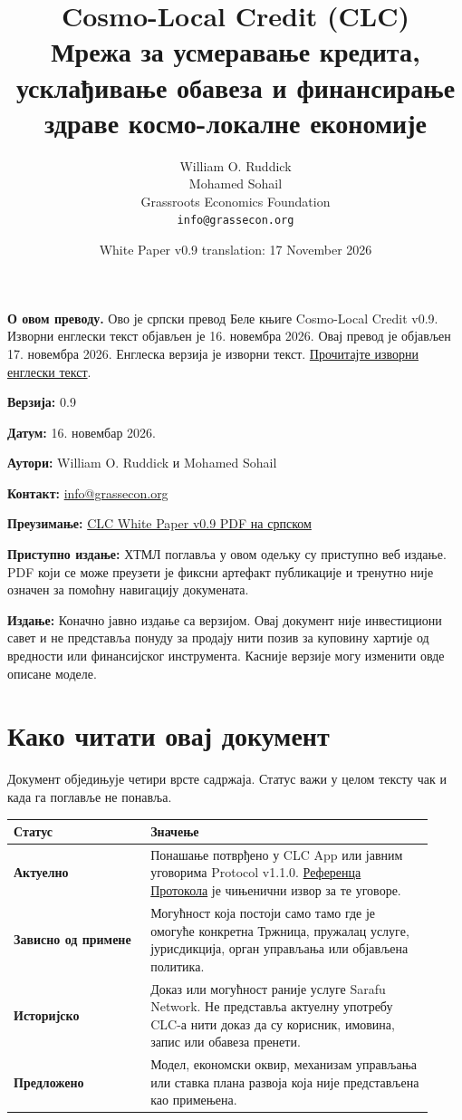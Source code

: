 \documentclass[11pt]{article}
\title{Cosmo-Local Credit (CLC)\\Мрежа за усмеравање кредита, усклађивање обавеза и финансирање здраве космо-локалне економије}
\author{William O. Ruddick \\ Mohamed Sohail \\ Grassroots Economics Foundation \\ \texttt{info@grassecon.org}}
\date{White Paper v0.9 translation: 17 November 2026}
\begin{document}
\maketitle
\tableofcontents
\newpage
\sloppy
\RaggedRight

\textbf{О овом преводу.} Ово је српски превод Беле књиге Cosmo-Local Credit v0.9. Изворни енглески текст објављен је 16. новембра 2026. Овај превод је објављен 17. новембра 2026. Енглеска верзија је изворни текст. \href{https://docs.cosmolocal.credit/white-paper}{Прочитајте изворни енглески текст}.

\textbf{Верзија:} 0.9

\textbf{Датум:} 16. новембар 2026.

\textbf{Аутори:} William O. Ruddick и Mohamed Sohail

\textbf{Контакт:} \href{mailto:info@grassecon.org}{info@grassecon.org}

\textbf{Преузимање:} \href{https://docs.cosmolocal.credit/white-paper/Cosmo-Local-Credit-CLC-White-Paper-v9-sr.pdf}{CLC White Paper v0.9 PDF на српском}

\textbf{Приступно издање:} ХТМЛ поглавља у овом одељку су приступно веб издање. PDF који се може преузети је фиксни артефакт публикације и тренутно није означен за помоћну навигацију докумената.

\textbf{Издање:} Коначно јавно издање са верзијом. Овај документ није инвестициони савет и не представља понуду за продају нити позив за куповину хартије од вредности или финансијског инструмента. Касније верзије могу изменити овде описане моделе.

\section*{Како читати овај документ}

Документ обједињује четири врсте садржаја. Статус важи у целом тексту чак и када га поглавље не понавља.

\begin{longtable}{P{0.30\linewidth} P{0.62\linewidth}}
\toprule
Статус & Значење \\
\midrule
\endhead
\textbf{Актуелно} & Понашање потврђено у CLC App или јавним уговорима Protocol v1.1.0. \href{https://docs.cosmolocal.credit/sr/protocol/overview}{Референца Протокола} је чињенични извор за те уговоре. \\
\textbf{Зависно од примене} & Могућност која постоји само тамо где је омогуће конкретна Тржница, пружалац услуге, јурисдикција, орган управљања или објављена политика. \\
\textbf{Историјско} & Доказ или могућност раније услуге Sarafu Network. Не представља актуелну употребу CLC-а нити доказ да су корисник, имовина, запис или обавеза пренети. \\
\textbf{Предложено} & Модел, економски оквир, механизам управљања или ставка плана развоја која није представљена као примењена. \\
\bottomrule
\end{longtable}
\end{document}
